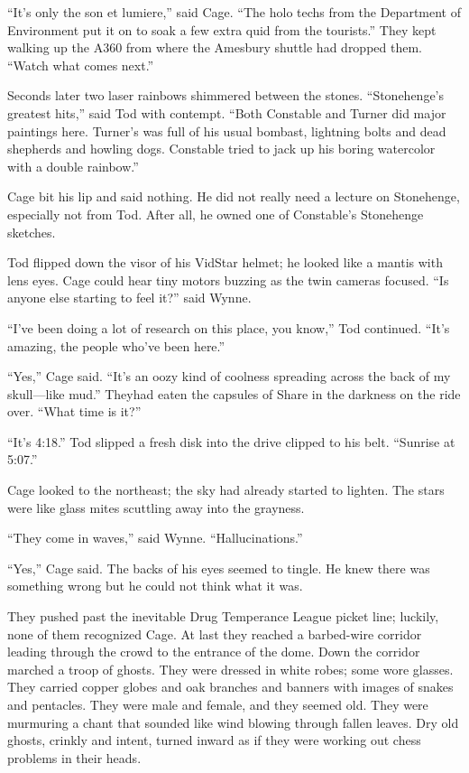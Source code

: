 “It’s only the son et lumiere,” said Cage. “The holo techs from the Department of Environment put it on to soak a few extra quid from the tourists.” They kept walking up the A360 from where the Amesbury shuttle had dropped them. “Watch what comes next.”

Seconds later two laser rainbows shimmered between the stones. “Stonehenge’s greatest hits,” said Tod with contempt. “Both Constable and Turner did major paintings here. Turner’s was full of his usual bombast, lightning bolts and dead shepherds and howling dogs. Constable tried to jack up his boring watercolor with a double rainbow.”

Cage bit his lip and said nothing. He did not really need a lecture on Stonehenge, especially not from Tod. After all, he owned one of Constable’s Stonehenge sketches.

Tod flipped down the visor of his VidStar helmet; he looked like a mantis with lens eyes. Cage could hear tiny motors buzzing as the twin cameras focused. “Is anyone else starting to feel it?” said Wynne.

“I’ve been doing a lot of research on this place, you know,” Tod continued. “It’s amazing, the people who’ve been here.”

“Yes,” Cage said. “It’s an oozy kind of coolness spreading across the back of my skull—like mud.” Theyhad eaten the capsules of Share in the darkness on the ride over. “What time is it?”

“It’s 4:18.” Tod slipped a fresh disk into the drive clipped to his belt. “Sunrise at 5:07.”

Cage looked to the northeast; the sky had already started to lighten. The stars were like glass mites scuttling away into the grayness.

“They come in waves,” said Wynne. “Hallucinations.”

“Yes,” Cage said. The backs of his eyes seemed to tingle. He knew there was something wrong but he could not think what it was.

They pushed past the inevitable Drug Temperance League picket line; luckily, none of them recognized Cage. At last they reached a barbed-wire corridor leading through the crowd to the entrance of the dome. Down the corridor marched a troop of ghosts. They were dressed in white robes; some wore glasses. They carried copper globes and oak branches and banners with images of snakes and pentacles. They were male and female, and they seemed old. They were murmuring a chant that sounded like wind blowing through fallen leaves. Dry old ghosts, crinkly and intent, turned inward as if they were working out chess problems in their heads.

